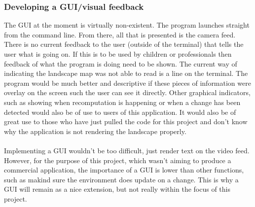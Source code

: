 \documentclass[11pt]{article}
\begin{document}
\subsubsection{Developing a GUI/visual feedback}
The GUI at the moment is virtually non-existent. The program launches 
straight from the command line. From there, all that is presented is
the camera feed. There is no current feedback to the user (outside of
the terminal) that tells the user what is going on. If this is to be
used by children or professionals then feedback of what the program is doing
need to be shown. The current way of indicating the landscape map was
not able to read is a line on the terminal. The program would be
much better and descriptive if these pieces of information were overlay
on the screen such the user can see it directly. Other graphical indicators,
such as showing when recomputation is happening or when a change has been
detected would also be of use to users of this application. It would 
also be of great use to those who have just pulled the code for this
project and don't know why the application is not rendering the 
landscape properly.\\
\\
Implementing a GUI wouldn't be too difficult, just render text on the 
video feed. However, for the purpose of this project, which wasn't aiming
to produce a commercial application, the importance of a GUI is
lower than other functions, such as makind sure the environment does update
on a change. This is why a GUI will remain as a nice extension, but not
really within the focus of this project.
\end{document}

